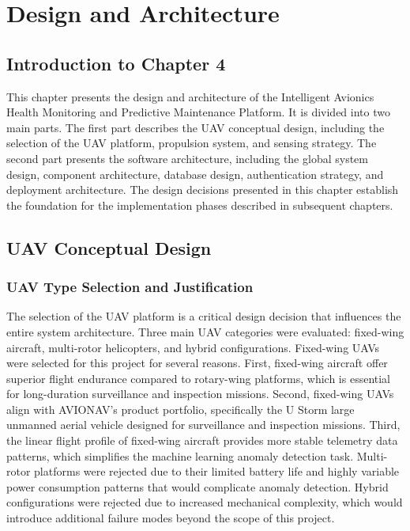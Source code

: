 \chapter{Design and Architecture}

\section*{Introduction to Chapter 4}

This chapter presents the design and architecture of the Intelligent Avionics Health Monitoring and Predictive Maintenance Platform. It is divided into two main parts. The first part describes the UAV conceptual design, including the selection of the UAV platform, propulsion system, and sensing strategy. The second part presents the software architecture, including the global system design, component architecture, database design, authentication strategy, and deployment architecture. The design decisions presented in this chapter establish the foundation for the implementation phases described in subsequent chapters.

\section{UAV Conceptual Design}

\subsection{UAV Type Selection and Justification}

The selection of the UAV platform is a critical design decision that influences the entire system architecture. Three main UAV categories were evaluated: fixed-wing aircraft, multi-rotor helicopters, and hybrid configurations. Fixed-wing UAVs were selected for this project for several reasons. First, fixed-wing aircraft offer superior flight endurance compared to rotary-wing platforms, which is essential for long-duration surveillance and inspection missions. Second, fixed-wing UAVs align with AVIONAV's product portfolio, specifically the U Storm large unmanned aerial vehicle designed for surveillance and inspection missions. Third, the linear flight profile of fixed-wing aircraft provides more stable telemetry data patterns, which simplifies the machine learning anomaly detection task. Multi-rotor platforms were rejected due to their limited battery life and highly variable power consumption patterns that would complicate anomaly detection. Hybrid configurations were rejected due to increased mechanical complexity, which would introduce additional failure modes beyond the scope of this project.

